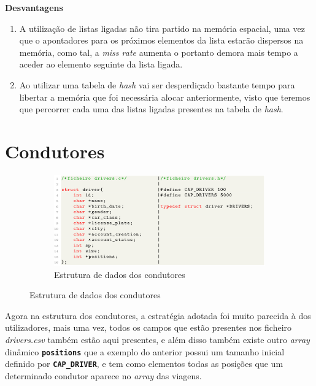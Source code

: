 \documentclass[12pt,a4paper]{report}
\begin{document}
\normalsize\textbf{Desvantagens}
    \begin{enumerate}
        \item A utilização de listas ligadas não tira partido na memória espacial, uma vez que o apontadores para os próximos elementos da lista estarão dispersos na memória, como tal, a \textit{miss rate} aumenta o portanto demora mais tempo a aceder ao elemento seguinte da lista ligada.
        
        \item Ao utilizar uma tabela de \textit{hash} vai ser desperdiçado bastante tempo para libertar a memória que foi necessária alocar anteriormente, visto que teremos que percorrer cada uma das listas ligadas presentes na tabela de \textit{hash}.
    \end{enumerate}

\pagebreak
\section{Condutores}

\begin{figure}[hbt!]
    \centering
    \begin{subfigure}{\textwidth}
        \centering
        \includegraphics[width=1\linewidth]{images/drivers.png}
        \caption*{Estrutura de dados dos condutores}
        \label{fig:drivers}
    \end{subfigure}
\end{figure}

Agora na estrutura dos condutores, a estratégia adotada foi muito parecida à dos utilizadores, mais uma vez, todos os campos que estão presentes nos ficheiro \textit{drivers.csv} também estão aqui presentes, e além disso também existe outro \textit{array} dinâmico \textbf{\small\texttt{positions}} que a exemplo do anterior possui um tamanho inicial definido por \textbf{\small\texttt{CAP\_DRIVER}}, e tem como elementos todas as posições que um determinado condutor aparece no \textit{array} das viagens.
\end{document}
